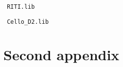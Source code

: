 \begin{center} \Large \verb| RITI.lib | \normalsize \\
    \vspace{0.2cm} \end{center}

\clearpage

\begin{center} \Large \verb| Cello_D2.lib | \normalsize \\
    \vspace{0.2cm} \end{center}

\clearpage

\section{Second appendix}